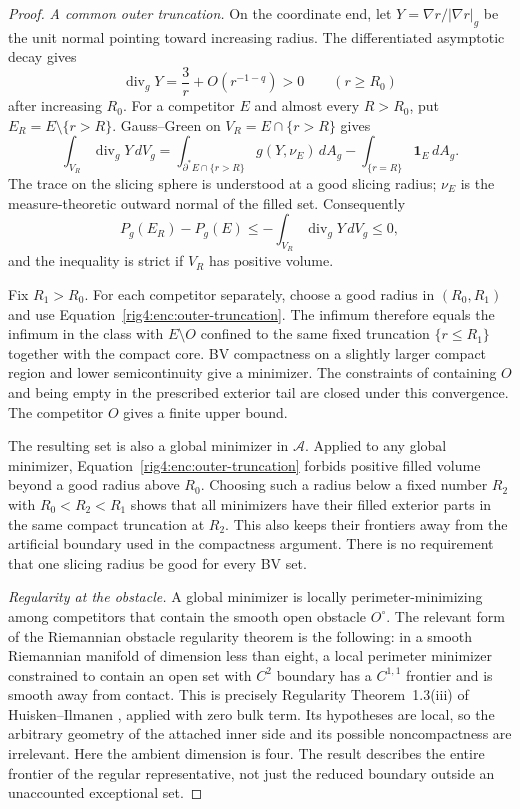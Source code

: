 \begin{proof}
\emph{A common outer truncation.}
On the coordinate end, let
$Y=\nabla r/|\nabla r|_g$ be the unit normal pointing toward increasing
radius. The differentiated asymptotic decay gives
\begin{equation}
 \operatorname{div}_gY=\frac{3}{r}+O(r^{-1-q})>0
 \qquad (r\ge R_0)
 \label{rig4:enc:outer-mean-convexity}
\end{equation}
after increasing $R_0$. For a competitor $E$ and almost every $R>R_0$,
put $E_R=E\setminus\{r>R\}$. Gauss--Green on
$V_R=E\cap\{r>R\}$ gives
\[
 \int_{V_R}\operatorname{div}_gY\,dV_g
 =\int_{\partial^*E\cap\{r>R\}}
       g(Y,\nu_E)\,dA_g
   -\int_{\{r=R\}}\mathbf 1_E\,dA_g.
\]
The trace on the slicing sphere is understood at a good slicing radius;
$\nu_E$ is the measure-theoretic outward normal of the filled set.
Consequently
\begin{equation}
 P_g(E_R)-P_g(E)
 \le -\int_{V_R}\operatorname{div}_gY\,dV_g\le0,
 \label{rig4:enc:outer-truncation}
\end{equation}
and the inequality is strict if $V_R$ has positive volume.

Fix $R_1>R_0$. For each competitor separately, choose a good radius in
$(R_0,R_1)$ and use Equation~\eqref{rig4:enc:outer-truncation}. The infimum
therefore equals the infimum in the class with $E\setminus O$ confined
to the same fixed truncation $\{r\le R_1\}$ together with the compact
core. BV compactness on a slightly larger compact region and lower
semicontinuity give a minimizer. The constraints of containing $O$ and
being empty in the prescribed exterior tail are closed under this
convergence. The competitor $O$ gives a finite upper bound.

The resulting set is also a global minimizer in $\mathcal A$. Applied
to any global minimizer, Equation~\eqref{rig4:enc:outer-truncation} forbids
positive filled volume beyond a good radius above $R_0$. Choosing such
a radius below a fixed number $R_2$ with $R_0<R_2<R_1$ shows that all
minimizers have their filled exterior parts in the same compact
truncation at $R_2$. This also keeps their frontiers away from the
artificial boundary used in the compactness argument. There is no
requirement that one slicing radius be good for every BV set.

\emph{Regularity at the obstacle.}
A global minimizer is locally perimeter-minimizing among competitors
that contain the smooth open obstacle $O^\circ$. The relevant form of
the Riemannian obstacle regularity theorem is the following: in a smooth
Riemannian manifold of dimension less than eight, a local perimeter
minimizer constrained to contain an open set with $C^2$ boundary has a
$C^{1,1}$ frontier and is smooth away from contact. This is precisely
Regularity Theorem~1.3(iii) of Huisken--Ilmanen
\cite[pp.~368--369]{HuiskenIlmanen2001}, applied with zero bulk term.
Its hypotheses are local, so the arbitrary geometry of the attached
inner side and its possible noncompactness are irrelevant. Here the
ambient dimension is four. The result describes the entire frontier
of the regular representative, not just the reduced boundary outside
an unaccounted exceptional set.


\end{proof}

